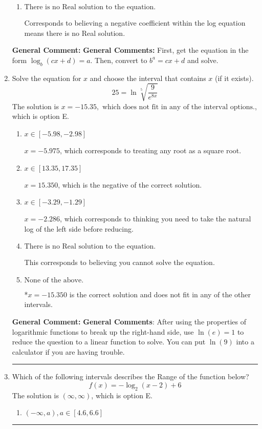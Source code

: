 \documentclass{extbook}[14pt]
\newcommand{\litem}[1]{\item #1

\rule{\textwidth}{0.4pt}}
\begin{document}
\begin{enumerate}
{\begin{enumerate}[label=\Alph*.]
$x = 3.500$, which corresponds to reversing the base and exponent when converting.
\item \( \text{There is no Real solution to the equation.} \)

Corresponds to believing a negative coefficient within the log equation means there is no Real solution.
\end{enumerate}

\textbf{General Comment:} \textbf{General Comments:} First, get the equation in the form $\log_b{(cx+d)} = a$. Then, convert to $b^a = cx+d$ and solve.
}
\litem{
 Solve the equation for $x$ and choose the interval that contains $x$ (if it exists).
\[  25 = \ln{\sqrt[5]{\frac{9}{e^{8x}}}} \]The solution is \( x = -15.35, \text{ which does not fit in any of the interval options.} \), which is option E.\begin{enumerate}[label=\Alph*.]
\item \( x \in [-5.98, -2.98] \)

$x = -5.975$, which corresponds to treating any root as a square root.
\item \( x \in [13.35, 17.35] \)

$x = 15.350$, which is the negative of the correct solution.
\item \( x \in [-3.29, -1.29] \)

$x = -2.286$, which corresponds to thinking you need to take the natural log of the left side before reducing.
\item \( \text{There is no Real solution to the equation.} \)

This corresponds to believing you cannot solve the equation.
\item \( \text{None of the above.} \)

*$x = -15.350$ is the correct solution and does not fit in any of the other intervals.
\end{enumerate}

\textbf{General Comment:} \textbf{General Comments}: After using the properties of logarithmic functions to break up the right-hand side, use $\ln(e) = 1$ to reduce the question to a linear function to solve. You can put $\ln(9)$ into a calculator if you are having trouble.
}
\litem{
Which of the following intervals describes the Range of the function below?
\[ f(x) = -\log_2{(x-2)}+6 \]The solution is \( (\infty, \infty) \), which is option E.\begin{enumerate}[label=\Alph*.]
\item \( (-\infty, a), a \in [4.6, 6.6] \)


\end{enumerate}}
\end{enumerate}
\end{document}
